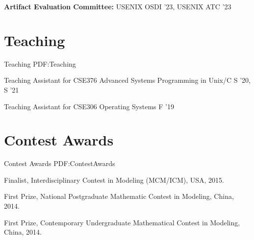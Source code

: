 \documentclass[a4paper,10pt,oneside]{article}
\newcommand{\CVNote}{CV updated on {\DatestampYM{2024}{08}} }
\begin{document}
\begin{body}
\textbf{Artifact Evaluation Committee:}
USENIX OSDI '23, USENIX ATC '23


\section
{Teaching}
{Teaching}
{PDF:Teaching}

Teaching Assistant for CSE376 Advanced Systems Programming in Unix/C 
\hfill
S '20, S '21

Teaching Assistant for CSE306 Operating Systems 
\hfill
F '19


\section
{Contest Awards}
{Contest Awards}
{PDF:ContestAwards}

\BulletItem
Finalist, Interdisciplinary Contest in Modeling (MCM/ICM), USA, 2015.

\BulletItem
First Prize, National Postgraduate Mathematic Contest in Modeling, China, 2014.

\BulletItem
First Prize, Contemporary Undergraduate Mathematical Contest in Modeling, China, 2014.










\end{body}


\label{LastPage}~
\end{document}
